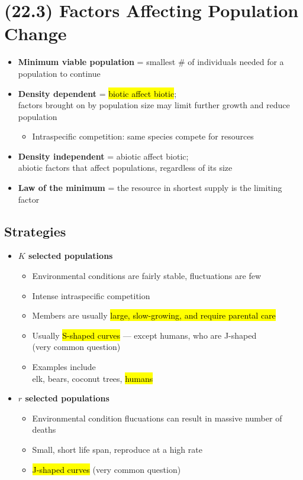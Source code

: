 \documentclass[a4paper,12pt]{article}
\begin{document}
\section{(22.3) Factors Affecting Population Change}
\begin{itemize}
    \item{\textbf{Minimum viable population} = smallest \# of individuals needed for a population to continue}
    \item{
            \textbf{Density dependent} = \hl{biotic affect biotic}; \\ factors brought on by population size may limit further growth and reduce population
            \begin{itemize}
                \item{Intraspecific competition: same species compete for resources}
            \end{itemize}
        }
    \item{\textbf{Density independent} = abiotic affect biotic; \\ abiotic factors that affect populations, regardless of its size}
    \item{\textbf{Law of the minimum} = the resource in shortest supply is the limiting factor}
\end{itemize}

\subsection{Strategies}
\begin{itemize}
    \item{
            \textbf{$K$ selected populations}
            \begin{itemize}
                \item{Environmental conditions are fairly stable, fluctuations are few}
                \item{Intense intraspecific competition}
                \item{Members are usually \hl{large, slow-growing, and require parental care}}
                \item{Usually \hl{S-shaped curves} --- except humans, who are J-shaped \\ (very common question)}
                \item{Examples include \\ elk, bears, coconut trees, \hl{humans}}
            \end{itemize}
        }
    \item{
            \textbf{$r$ selected populations}
            \begin{itemize}
                \item{Environmental condition flucuations can result in massive number of deaths}
                \item{Small, short life span, reproduce at a high rate}
                \item{\hl{J-shaped curves} (very common question)}
            \end{itemize}
        }
\end{itemize}
\end{document}
